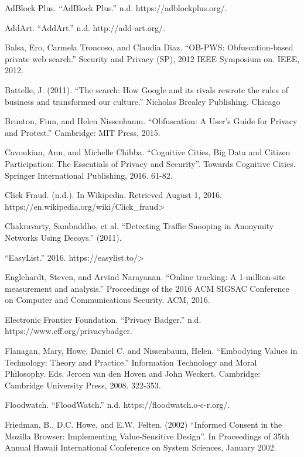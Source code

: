 \documentclass[conference]{IEEEtran}
\begin{document}
\begin{thebibliography}{99}

 AdBlock Plus. “AdBlock Plus.” n.d. https://adblockplus.org/.

 AddArt. “AddArt.” n.d. http://add-art.org/.

 Balsa, Ero, Carmela Troncoso, and Claudia Diaz. “OB-PWS: Obfuscation-based private web search.” Security and Privacy (SP), 2012 IEEE Symposium on. IEEE, 2012.

 Battelle, J. (2011). “The search: How Google and its rivals rewrote the rules of business and transformed our culture.” Nicholas Brealey Publishing. Chicago

 Brunton, Finn, and Helen Nissenbaum. “Obfuscation: A User's Guide for Privacy and Protest.” Cambridge: MIT Press, 2015.

 Cavoukian, Ann, and Michelle Chibba. “Cognitive Cities, Big Data and Citizen Participation: The Essentials of Privacy and Security”. Towards Cognitive Cities. Springer International Publishing, 2016. 61-82.

 Click Fraud. (n.d.). In Wikipedia. Retrieved August 1, 2016. https://en.wikipedia.org/wiki/Click\_fraud>

 Chakravarty, Sambuddho, et al. “Detecting Traffic Snooping in Anonymity Networks Using Decoys.” (2011).

 “EasyList.” 2016. https://easylist.to/>

 Englehardt, Steven, and Arvind Narayanan. “Online tracking: A 1-million-site measurement and analysis.” Proceedings of the 2016 ACM SIGSAC Conference on Computer and Communications Security. ACM, 2016.

 Electronic Frontier Foundation. “Privacy Badger.” n.d. https://www.eff.org/privacybadger.

 Flanagan, Mary, Howe, Daniel C. and Nissenbaum, Helen. “Embodying Values in Technology: Theory and Practice.” Information Technology and Moral Philosophy. Eds. Jeroen van den Hoven and John Weckert. Cambridge: Cambridge University Press, 2008. 322-353.

 Floodwatch. “FloodWatch.” n.d. https://floodwatch.o-c-r.org/.

 Friedman, B., D.C. Howe, and E.W. Felten. (2002) “Informed Consent in the Mozilla Browser: Implementing Value-Sensitive Design”. In Proceedings of 35th Annual Hawaii International Conference on System Sciences, January 2002.


\end{thebibliography}
\end{document}
